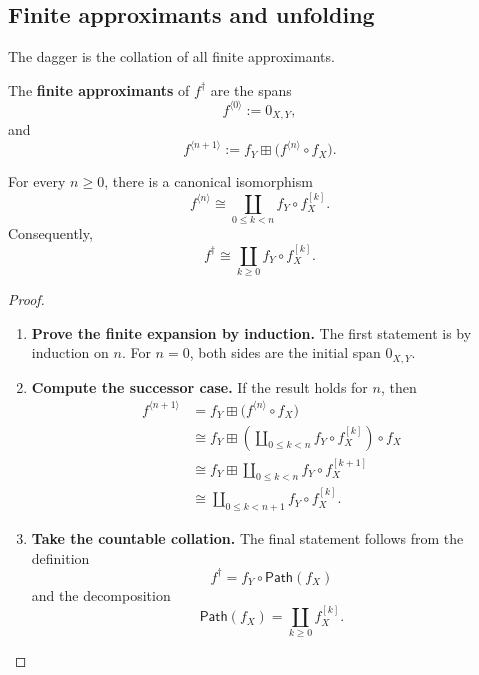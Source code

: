 \subsection{Finite approximants and unfolding}
\label{subsec:dagger-approximants-feedback}

The dagger is the collation of all finite approximants.

\begin{definition}
\label{def:finite-approximants-dagger}
The \textbf{finite approximants} of \(f^\dagger\) are the spans
\[
  f^{\langle 0\rangle}:=0_{X,Y},
\]
and
\[
  f^{\langle n+1\rangle}
  :=
  f_Y\boxplus
  \bigl(f^{\langle n\rangle}\circ f_X\bigr).
\]
\end{definition}

\begin{lemma}
\label{lem:approximant-expansion-dagger}
For every \(n\geq 0\), there is a canonical isomorphism
\[
  f^{\langle n\rangle}
  \cong
  \coprod_{0\leq k<n}
  f_Y\circ f_X^{[k]}.
\]
Consequently,
\[
  f^\dagger
  \cong
  \coprod_{k\geq 0}
  f_Y\circ f_X^{[k]}.
\]
\end{lemma}

\begin{proof}
\begin{enumerate}
  \item \textbf{Prove the finite expansion by induction.}
  The first statement is by induction on \(n\). For \(n=0\), both sides are
  the initial span \(0_{X,Y}\).

  \item \textbf{Compute the successor case.}
  If the result holds for \(n\), then
  \[
  \begin{aligned}
    f^{\langle n+1\rangle}
    &=
    f_Y\boxplus
    \bigl(f^{\langle n\rangle}\circ f_X\bigr)
    \\
    &\cong
    f_Y
    \boxplus
    \left(
      \coprod_{0\leq k<n}
      f_Y\circ f_X^{[k]}
    \right)
    \circ f_X
    \\
    &\cong
    f_Y
    \boxplus
    \coprod_{0\leq k<n}
    f_Y\circ f_X^{[k+1]}
    \\
    &\cong
    \coprod_{0\leq k<n+1}
    f_Y\circ f_X^{[k]}.
  \end{aligned}
  \]

  \item \textbf{Take the countable collation.}
  The final statement follows from the definition
  \[
    f^\dagger=f_Y\circ\mathsf{Path}(f_X)
  \]
  and the decomposition
  \[
    \mathsf{Path}(f_X)=\coprod_{k\geq 0}f_X^{[k]}.
  \]
\end{enumerate}
\end{proof}

